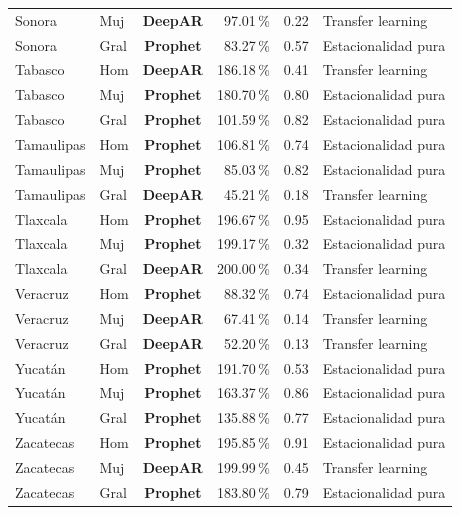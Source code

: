 \documentclass[12pt, letterpaper]{article}
\begin{document}
\begin{longtable}{l l >{\bfseries}c r r l}
Sonora & Muj & \textcolor{cdeepar}{\textbf{DeepAR}} & 97.01\,\% & 0.22 & Transfer learning \\
Sonora & Gral & \textcolor{cprophet}{\textbf{Prophet}} & 83.27\,\% & 0.57 & Estacionalidad pura \\
Tabasco & Hom & \textcolor{cdeepar}{\textbf{DeepAR}} & 186.18\,\% & 0.41 & Transfer learning \\
Tabasco & Muj & \textcolor{cprophet}{\textbf{Prophet}} & 180.70\,\% & 0.80 & Estacionalidad pura \\
Tabasco & Gral & \textcolor{cprophet}{\textbf{Prophet}} & 101.59\,\% & 0.82 & Estacionalidad pura \\
Tamaulipas & Hom & \textcolor{cprophet}{\textbf{Prophet}} & 106.81\,\% & 0.74 & Estacionalidad pura \\
Tamaulipas & Muj & \textcolor{cprophet}{\textbf{Prophet}} & 85.03\,\% & 0.82 & Estacionalidad pura \\
Tamaulipas & Gral & \textcolor{cdeepar}{\textbf{DeepAR}} & 45.21\,\% & 0.18 & Transfer learning \\
Tlaxcala & Hom & \textcolor{cprophet}{\textbf{Prophet}} & 196.67\,\% & 0.95 & Estacionalidad pura \\
Tlaxcala & Muj & \textcolor{cprophet}{\textbf{Prophet}} & 199.17\,\% & 0.32 & Estacionalidad pura \\
Tlaxcala & Gral & \textcolor{cdeepar}{\textbf{DeepAR}} & 200.00\,\% & 0.34 & Transfer learning \\
Veracruz & Hom & \textcolor{cprophet}{\textbf{Prophet}} & 88.32\,\% & 0.74 & Estacionalidad pura \\
Veracruz & Muj & \textcolor{cdeepar}{\textbf{DeepAR}} & 67.41\,\% & 0.14 & Transfer learning \\
Veracruz & Gral & \textcolor{cdeepar}{\textbf{DeepAR}} & 52.20\,\% & 0.13 & Transfer learning \\
Yucatán & Hom & \textcolor{cprophet}{\textbf{Prophet}} & 191.70\,\% & 0.53 & Estacionalidad pura \\
Yucatán & Muj & \textcolor{cprophet}{\textbf{Prophet}} & 163.37\,\% & 0.86 & Estacionalidad pura \\
Yucatán & Gral & \textcolor{cprophet}{\textbf{Prophet}} & 135.88\,\% & 0.77 & Estacionalidad pura \\
Zacatecas & Hom & \textcolor{cprophet}{\textbf{Prophet}} & 195.85\,\% & 0.91 & Estacionalidad pura \\
Zacatecas & Muj & \textcolor{cdeepar}{\textbf{DeepAR}} & 199.99\,\% & 0.45 & Transfer learning \\
Zacatecas & Gral & \textcolor{cprophet}{\textbf{Prophet}} & 183.80\,\% & 0.79 & Estacionalidad pura \\
\end{longtable}
\normalsize
\end{document}
